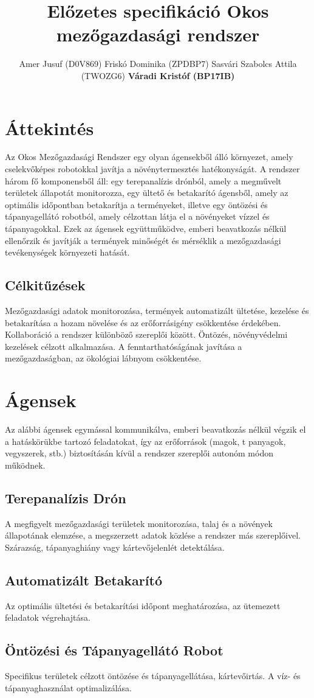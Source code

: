 \documentclass[11pt]{article}
\title{\RaggedRight\huge \textbf{Előzetes specifikáció}
 \newline \vspace*{6pt}\Large Okos mezőgazdasági rendszer}
\author{
Amer Jusuf (D0V869)
\newline
Friskó Dominika (ZPDBP7)
\newline
Sasvári Szabolcs Attila (TWOZG6)
\newline
\textbf{Váradi Kristóf (BP17IB)}}
\date{}
\begin{document}
\maketitle

\section{Áttekintés}

Az Okos Mezőgazdasági Rendszer egy olyan ágensekből álló környezet,
amely cselekvőképes robotokkal javítja a növénytermesztés hatékonyságát.
A rendszer három fő komponensből áll: egy terepanalízis drónból, amely a megművelt területek állapotát monitorozza,
egy ültető és betakarító ágensből, amely az optimális időpontban betakarítja a terményeket, illetve egy öntözési és tápanyagellátó robotból,
amely célzottan látja el a növényeket vízzel és tápanyagokkal.
Ezek az ágensek együttműködve, emberi beavatkozás nélkül
ellenőrzik és javítják a termények minőségét és mérséklik a mezőgazdasági tevékenységek környezeti hatását.

\subsection{Célkitűzések}
Mezőgazdasági adatok monitorozása,
termények automatizált ültetése, kezelése és betakarítása
a hozam növelése és az erőforrásigény csökkentése érdekében.
Kollaboráció a rendszer különböző szereplői között.
Öntözés, növényvédelmi kezelések célzott alkalmazása.
A fenntarthatóságának javítása a mezőgazdaságban,
az ökológiai lábnyom csökkentése.

\section{Ágensek}

Az alábbi ágensek egymással kommunikálva, emberi beavatkozás nélkül
végzik el a hatáskörükbe tartozó feladatokat, így az erőforrások (magok, t
panyagok, vegyszerek, stb.) biztosításán kívül a rendszer szereplői autonóm módon működnek.

\subsection{Terepanalízis Drón}

A megfigyelt mezőgazdasági területek monitorozása,
talaj és a növények állapotának elemzése,
a megszerzett adatok közlése a rendszer más szereplőivel.
Szárazság, tápanyaghiány vagy kártevőjelenlét detektálása.

\subsection{Automatizált Betakarító}

Az optimális ültetési és betakarítási időpont meghatározása, az ütemezett feladatok végrehajtása.

\subsection{Öntözési és Tápanyagellátó Robot}

Specifikus területek célzott öntözése és tápanyagellátása, kártevőirtás.
A víz- és tápanyaghasználat optimalizálása.
\end{document}
